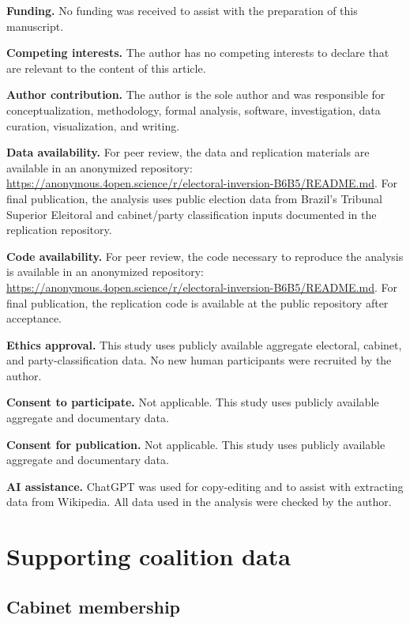 \documentclass[11pt]{article}
\begin{document}
\textbf{Funding.} No funding was received to assist with the preparation of this manuscript.

\textbf{Competing interests.} The author has no competing interests to declare that are relevant to the content of this article.

\textbf{Author contribution.} The author is the sole author and was responsible for conceptualization, methodology, formal analysis, software, investigation, data curation, visualization, and writing.

\textbf{Data availability.} For peer review, the data and replication materials are available in an anonymized repository: \url{https://anonymous.4open.science/r/electoral-inversion-B6B5/README.md}. For final publication, the analysis uses public election data from Brazil's Tribunal Superior Eleitoral and cabinet/party classification inputs documented in the replication repository.

\textbf{Code availability.} For peer review, the code necessary to reproduce the analysis is available in an anonymized repository: \url{https://anonymous.4open.science/r/electoral-inversion-B6B5/README.md}. For final publication, the replication code is available at the public repository after acceptance.

\textbf{Ethics approval.} This study uses publicly available aggregate electoral, cabinet, and party-classification data. No new human participants were recruited by the author. 

\textbf{Consent to participate.} Not applicable. This study uses publicly available aggregate and documentary data.

\textbf{Consent for publication.} Not applicable. This study uses publicly available aggregate and documentary data.

\textbf{AI assistance.} ChatGPT was used for copy-editing and to assist with extracting data from Wikipedia. All data used in the analysis were checked by the author.


\printbibliography


\clearpage
\appendix

\section{Supporting coalition data}
\label{app:accounting-diagnostics}

\subsection{Cabinet membership}
\label{app:composition}
\end{document}
